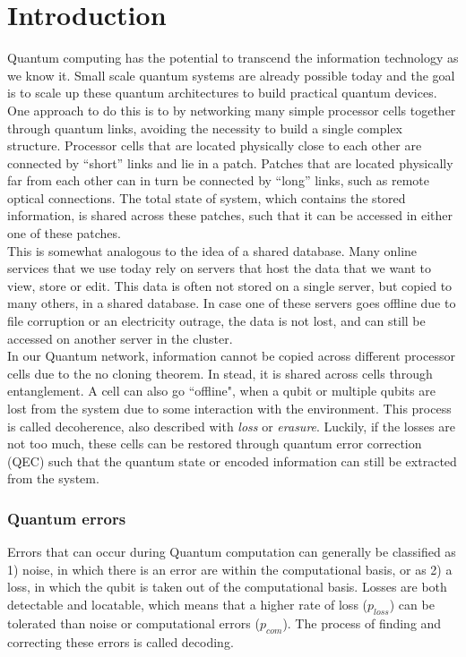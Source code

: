 \chapter{Introduction}


Quantum computing has the potential to transcend the information technology as we know it. Small scale quantum systems are already possible today and the goal is to scale up these quantum architectures to build practical quantum devices. One approach to do this is to by networking many simple processor cells together through quantum links, avoiding the necessity to build a single complex structure. Processor cells that are located physically close to each other are connected by ``short'' links and lie in a patch. Patches that are located physically far from each other can in turn be connected by ``long'' links, such as remote optical connections. The total state of system, which contains the stored information, is shared across these patches, such that it can be accessed in either one of these patches. \\

This is somewhat analogous to the idea of a shared database. Many online services that we use today rely on servers that host the data that we want to view, store or edit. This data is often not stored on a single server, but copied to many others, in a shared database. In case one of these servers goes offline due to file corruption or an electricity outrage, the data is not lost, and can still be accessed on another server in the cluster.\\

In our Quantum network, information cannot be copied across different processor cells due to the no cloning theorem. In stead, it is shared across cells through entanglement. A cell can also go ``offline", when a qubit or multiple qubits are lost from the system due to some interaction with the environment. This process is called decoherence, also described with \emph{loss} or \emph{erasure}. Luckily, if the losses are not too much, these cells can be restored through quantum error correction (QEC) such that the quantum state or encoded information can still be extracted from the system. \\

\subsection{Quantum errors}
Errors that can occur during Quantum computation can generally be classified as 1) noise, in which there is an error are within the computational basis, or as 2) a loss, in which the qubit is
taken out of the computational basis. Losses are both detectable and locatable, which means that a higher rate of loss ($p_{loss}$) can be tolerated than noise or computational errors ($p_{com}$). The process of finding and correcting these errors is called decoding. \\

